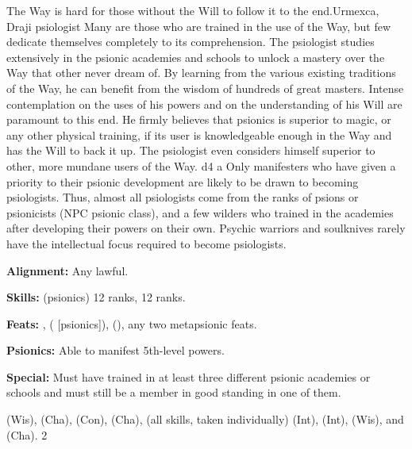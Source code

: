 {The Way is hard for those without the Will to follow it to the end.}{Urmexca, Draji psiologist}
{Many are those who are trained in the use of the Way, but few dedicate themselves completely to its comprehension. The psiologist studies extensively in the psionic academies and schools to unlock a mastery over the Way that other never dream of. By learning from the various existing traditions of the Way, he can benefit from the wisdom of hundreds of great masters. Intense contemplation on the uses of his powers and on the understanding of his Will are paramount to this end. He firmly believes that psionics is superior to magic, or any other physical training, if its user is knowledgeable enough in the Way and has the Will to back it up. The psiologist even considers himself superior to other, more mundane users of the Way.}
{d4}
{a}
{Only manifesters who have given a priority to their psionic development are likely to be drawn to becoming psiologists. Thus, almost all psiologists come from the ranks of psions or psionicists (NPC psionic class), and a few wilders who trained in the academies after developing their powers on their own. Psychic warriors and soulknives rarely have the intellectual focus required to become psiologists.}
{
\textbf{Alignment:} Any lawful.

\textbf{Skills:}  (psionics) 12 ranks,  12 ranks.

\textbf{Feats:} ,  ( [psionics]),  (), any two metapsionic feats.

\textbf{Psionics:} Able to manifest 5th-level powers.

\textbf{Special:} Must have trained in at least three different psionic academies or schools and must still be a member in good standing in one of them.
}
{
 (Wis),  (Cha),  (Con),  (Cha),  (all skills, taken individually) (Int),  (Int),  (Wis), and  (Cha).
}
{2}
